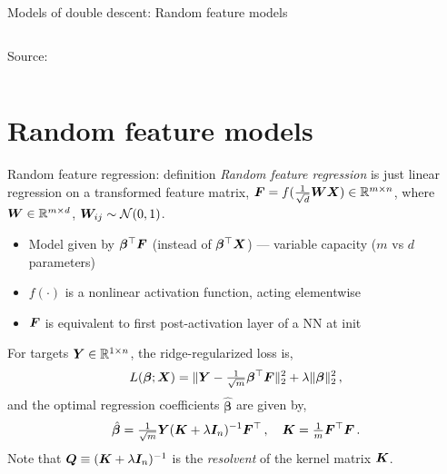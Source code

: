 \documentclass[10pt, aspectratio=169]{beamer}
\newcommand{\bbeta}{\bm{\beta}}
\begin{document}
\begin{frame}{Models of double descent: Random feature models}
\begin{columns}
\begin{column}{0.5\linewidth}
\begin{center}
\vspace{-0.2cm}
\hspace{-1cm}
{\scriptsize Source: \citep{mei2019generalization}}
\end{center}

\end{column}
\end{columns}
\end{frame}
\section{Random feature models}
\begin{frame}[t]{Random feature regression: definition}
\emph{Random feature regression} is just linear regression on a transformed feature matrix, ${\boldsymbol F} = f(\tfrac{1}{\sqrt{d}}{\boldsymbol W}{\boldsymbol X}) \in \mathbb{R}^{m \times n}$, where ${\boldsymbol W}\in\mathbb{R}^{m\times d}$, ${\boldsymbol W}_{ij}\sim \mathcal{N}(0,1)$.
\begin{itemize}
    \item Model given by $\bbeta^\top \FF$ (instead of $\bbeta^\top \XX$) --- variable capacity ($m$ vs $d$ parameters)
    \item $f(\cdot)$ is a nonlinear activation function, acting elementwise
    \item ${\boldsymbol F}$ is equivalent to first post-activation layer of a NN at init
\end{itemize}
\pause
For targets ${\boldsymbol Y}\in\mathbb{R}^{1\times n}$, the ridge-regularized loss is, 
$$L(\bbeta; \XX) = \|\YY - \tfrac{1}{\sqrt{m}}\bbeta^\top \FF\|_2^2 + \lambda \|\bbeta\|_2^2\,,$$
and the optimal regression coefficients $\hat{\bbeta}$ are given by,
$$\hat{\bbeta} = \tfrac{1}{\sqrt{m}}\YY(\KK + \lambda \II_n)^{-1}\FF^\top\,,\quad \KK = \tfrac{1}{m}\FF^\top \FF\,.$$
\pause
Note that ${\boldsymbol Q} \equiv ({\boldsymbol K} + \lambda {\boldsymbol I}_n)^{-1}$ is the \emph{resolvent} of the kernel matrix ${\boldsymbol K}$.
\end{frame}
\end{document}
